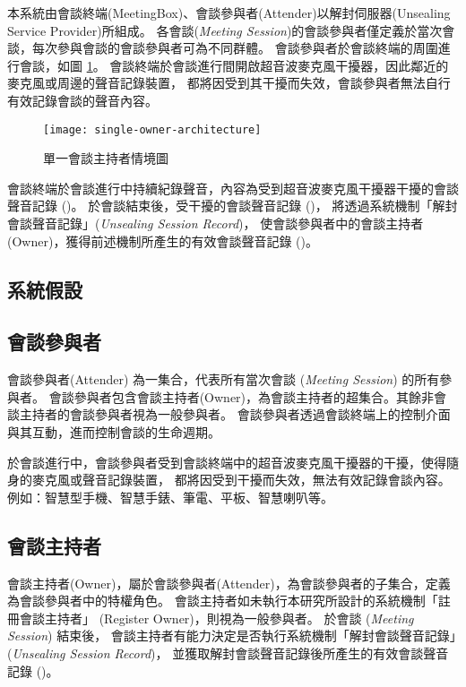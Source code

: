     本系統由會談終端(MeetingBox)、會談參與者(Attender)以解封伺服器(Unsealing Service Provider)所組成。
各會談({\it Meeting Session})的會談參與者僅定義於當次會談，每次參與會談的會談參與者可為不同群體。
會談參與者於會談終端的周圍進行會談，如圖 \ref{fig:s-o-arch}。
會談終端於會談進行間開啟超音波麥克風干擾器，因此鄰近的麥克風或周邊的聲音記錄裝置，
都將因受到其干擾而失效，會談參與者無法自行有效記錄會談的聲音內容。

\begin{figure}[H]
    \centering
    \texttt{[image: single-owner-architecture]}
    \caption{單一會談主持者情境圖}\label{fig:s-o-arch}
\end{figure}

    會談終端於會談進行中持續紀錄聲音，內容為受到超音波麥克風干擾器干擾的會談聲音記錄 (\DEFrecJ)。
於會談結束後，受干擾的會談聲音記錄 (\DEFrecJ)，
將透過系統機制「解封會談聲音記錄」({\it Unsealing Session Record})，
使會談參與者中的會談主持者(Owner)，獲得前述機制所產生的有效會談聲音記錄 (\DEFrecREV)。


\subsection{系統假設}


\subsection{會談參與者}

    會談參與者(Attender) 為一集合，代表所有當次會談 ({\it Meeting Session}) 的所有參與者。
會談參與者包含會談主持者(Owner)，為會談主持者的超集合。其餘非會談主持者的會談參與者視為一般參與者。
會談參與者透過會談終端上的控制介面與其互動，進而控制會談的生命週期。

    於會談進行中，會談參與者受到會談終端中的超音波麥克風干擾器的干擾，使得隨身的麥克風或聲音記錄裝置，
都將因受到干擾而失效，無法有效記錄會談內容。例如：智慧型手機、智慧手錶、筆電、平板、智慧喇叭等。


\subsection{會談主持者}

    會談主持者(Owner)，屬於會談參與者(Attender)，為會談參與者的子集合，定義為會談參與者中的特權角色。
會談主持者如未執行本研究所設計的系統機制「註冊會談主持者」 (Register Owner)，則視為一般參與者。
於會談 ({\it Meeting Session}) 結束後，
會談主持者有能力決定是否執行系統機制「解封會談聲音記錄」({\it Unsealing Session Record})，
並獲取解封會談聲音記錄後所產生的有效會談聲音記錄 (\DEFrecREV)。

